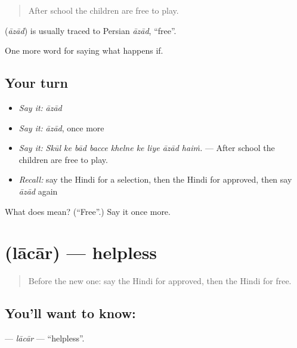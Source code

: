 \begin{quote}
After school the children are free to play.
\end{quote}

\begin{cousinweb}
\textbf{} (\emph{āzād}) is usually traced to Persian \emph{āzād}, \textquotedblleft{}free\textquotedblright{}.
\end{cousinweb}

\begin{grammarlens}[title={What you've built}]
One more word for saying what happens if.
\end{grammarlens}

\subsection*{Your turn}
\begin{itemize}
\raggedright
  \item \emph{Say it:} \emph{āzād}
  \item \emph{Say it:} \emph{āzād}, once more
  \item \emph{Say it:} \emph{Skūl ke bād bacce khelne ke liye āzād haiṁ.} — After school the children are free to play.
  \item \emph{Recall:} say the Hindi for a selection, then the Hindi for approved, then say \emph{āzād} again
\end{itemize}

\begin{tcolorbox}[breakable,colback=teal!4,colframe=teal!35!black,title={Before you move on}]
What does  mean? (\textquotedblleft{}Free\textquotedblright{}.) Say it once more.
\end{tcolorbox}
\section[\texorpdfstring{\hi{लाचार} (lācār)}{लाचार (lācār)}]{ (lācār) — helpless}

\label{lesson:HI-C551-lacar}



\begin{quote}
Before the new one: say the Hindi for approved, then the Hindi for free.
\end{quote}

\subsection*{You'll want to know: }
\textbf{} — \emph{lācār} — \textquotedblleft{}helpless\textquotedblright{}.

